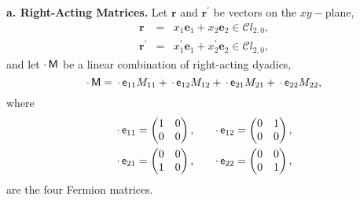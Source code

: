 \documentclass[11pt,twocolumn]{article}
\begin{document}
\textbf{a.  Right-Acting Matrices.}  Let $\mathbf r$ and $\mathbf r^\prime$ be vectors on the $xy-$plane,
\begin{eqnarray}
\label{eq:r in Cl_2,0}
\mathbf r&=&x_1\mathbf e_1+x_2\mathbf e_2\in\mathcal Cl_{2,0},\\
\label{eq:r' in Cl_2,0}
\mathbf r^\prime&=&x_1^\prime\mathbf e_1+x_2^\prime\mathbf e_2\in\mathcal Cl_{2,0},
\end{eqnarray}
and let $\cdot\,\textsf M$ be a linear combination of right-acting dyadics,
\begin{equation}
\label{eq:M is M_11 e_11 + M_12 e_12 + M_21 e_21 + M_22 e_22 right}
\cdot\,\textsf M=\,\cdot\,\textsf e_{11}M_{11}+\,\cdot\,\textsf e_{12}M_{12}+\,\cdot\,\textsf e_{21}M_{21}+\,\cdot\,\textsf e_{22}M_{22},
\end{equation}
where
\begin{eqnarray}
\label{eq:e_11 and e_12 matrix right}
\cdot\,\textsf e_{11}=
\begin{pmatrix}
1&0\\
0&0
\end{pmatrix}
,&\quad&
\cdot\,\textsf e_{12}=
\begin{pmatrix}
0&1\\
0&0
\end{pmatrix}
,
\\
\label{eq:e_21 and e_22 matrix right}
\cdot\,\textsf e_{21}=
\begin{pmatrix}
0&0\\
1&0
\end{pmatrix}
,&\quad&
\cdot\,\textsf e_{22}=
\begin{pmatrix}
0&0\\
0&1
\end{pmatrix}
,
\end{eqnarray}
are the four Fermion matrices.
\end{document}
